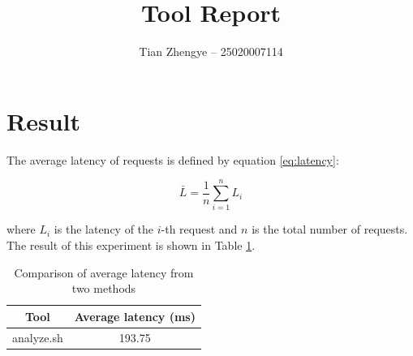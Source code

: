 \documentclass{article}
\begin{document}
  \title{Tool Report}
  \author{Tian Zhengye -- 25020007114}
  \maketitle

  \section{Result}

  The average latency of requests is defined by equation \eqref{eq:latency}:

  \begin{equation}
      \bar{L} = \frac{1}{n} \sum_{i=1}^{n} L_i
      \label{eq:latency}
  \end{equation}

  where $L_i$ is the latency of the $i$-th request and $n$ is the total number
  of requests. The result of this experiment is shown in Table \ref{tab:tools}.

  \begin{table}[htbp]
      \centering
      \begin{tabular}{|c|c|}
          \hline
          Tool & Average latency (ms) \\
          \hline
          analyze.sh & 193.75 \\
          \hline
      \end{tabular}
      \caption{Comparison of average latency from two methods}
      \label{tab:tools}
  \end{table}
\end{document}
